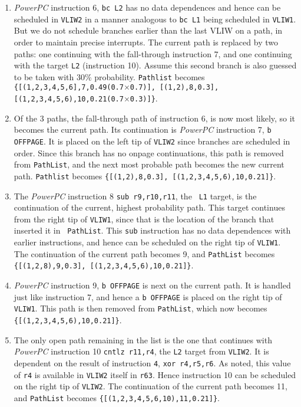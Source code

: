 \begin{small}
\begin{enumerate}
\item {\it PowerPC} instruction 6, {\tt bc L2} has no data
dependences and hence can be scheduled in {\tt VLIW2} in a manner
analogous to {\tt bc L1} being scheduled in {\tt VLIW1}.  But we do
not schedule branches earlier than the last VLIW on a path, in order
to maintain precise interrupts.  The current path is replaced by
two paths: one continuing with the fall-through instruction 7, and
one continuing with the target {\tt L2} (instruction 10). Assume this
second branch is also guessed to be taken with 30\% probability.
{\tt Pathlist} becomes {\tt \{[(1,2,3,4,5,6],7,0.49(0.7$\times$0.7)],
[(1,2),8,0.3], [(1,2,3,4,5,6),10,0.21(0.7$\times$0.3)]\}}.

\item Of the 3 paths, the fall-through path of instruction 6, is now
most likely, so it becomes the current path.  Its continuation is
{\it PowerPC} instruction 7, {\tt b OFFPAGE}.  It is placed on the
left tip of {\tt VLIW2} since branches are scheduled in order.
Since this branch has no onpage continuations, this path is removed
from {\tt PathList}, and the next most probable path becomes the new
current path.  {\tt Pathlist} becomes {\tt \{[(1,2),8,0.3],
[(1,2,3,4,5,6),10,0.21]\}}.

\item The {\it PowerPC} instruction 8 {\tt sub r9,r10,r11}, the {\tt
L1} target, is the continuation of the current, highest probability
path.  This target continues from the right tip of {\tt VLIW1},
since that is the location of the branch that inserted it in {\tt
PathList}.  This {\tt sub} instruction has no data dependences with
earlier instructions, and hence can be scheduled on the right tip of
{\tt VLIW1}.  The continuation of the current path becomes 9, and
{\tt PathList} becomes {\tt \{[(1,2,8),9,0.3],
[(1,2,3,4,5,6),10,0.21]\}}.


\item {\it PowerPC} instruction 9, {\tt b OFFPAGE} is next on the
current path.  It is handled just like instruction 7, and hence a
{\tt b OFFPAGE} is placed on the right tip of {\tt VLIW1}.  This
path is then removed from {\tt PathList}, which now becomes {\tt
\{[(1,2,3,4,5,6),10,0.21]\}}.

\item The only open path remaining in the list is the one that
continues with {\it PowerPC} instruction 10 {\tt cntlz r11,r4}, the
{\tt L2} target from {\tt VLIW2}.  It is dependent on the result of
instruction {\tt 4}, {\tt xor r4,r5,r6}.  As noted, this value of
{\tt r4} is available in {\tt VLIW2} itself in {\tt r63}.  Hence
instruction 10 can be scheduled on the right tip of {\tt VLIW2}.
The continuation of the current path becomes 11, and {\tt PathList}
becomes {\tt \{[(1,2,3,4,5,6,10),11,0.21]\}}.


\end{enumerate}
\end{small}
